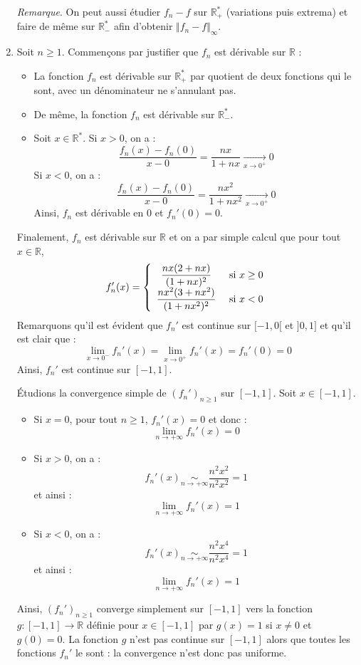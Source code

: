 \documentclass[a4paper,10pt]{report}
\begin{document}
\begin{enumerate}
\medskip

\noindent \textit{Remarque}. On peut aussi étudier $f_n-f$ sur $\mathbb{R}_+^{*}$ (variations puis extrema) et faire de même sur $\mathbb{R}_{-}^*$ afin d'obtenir $\Vert f_n-f \Vert_{\infty}$.

\medskip

\item Soit $n \geq 1$. Commençons par justifier que $f_n$ est dérivable sur $\mathbb{R}$ :
\begin{itemize}
\item La fonction $f_n$ est dérivable sur $\mathbb{R}_+^{*}$ par quotient de deux fonctions qui le sont, avec un dénominateur ne s'annulant pas.
\item De même, la fonction $f_n$ est dérivable sur $\mathbb{R}_{-}^{*}$.
\item Soit $x \in \mathbb{R}^*$. Si $x>0$, on a :
$$ \dfrac{f_n(x)-f_n(0)}{x-0} = \dfrac{nx}{1+nx} \underset{x \rightarrow 0^{+}}{\longrightarrow} 0$$
Si $x<0$, on a :
$$ \dfrac{f_n(x)-f_n(0)}{x-0} = \dfrac{nx^2}{1+nx^2} \underset{x \rightarrow 0^{+}}{\longrightarrow} 0$$
Ainsi, $f_n$ est dérivable en $0$ et $f_n'(0)=0$.
\end{itemize}

\medskip

\noindent Finalement, $f_n$ est dérivable sur $\mathbb{R}$ et on a par simple calcul que pour tout $x \in \mathbb{R}$,
$$ f_n'(x)  = \left\lbrace \begin{array}{cl}
\dfrac{nx(2+nx)}{(1+nx)^2} & \hbox{ si } x \geq 0 \\
\dfrac{nx^2(3+nx^2)}{(1+nx^2)^2} & \hbox{ si }x  < 0 \\
\end{array}\right.$$
Remarquons qu'il est évident que $f_n'$ est continue sur $[-1,0[$ et $]0,1]$ et qu'il est clair que :
$$ \lim_{x \rightarrow 0^{-}} f_n'(x) = \lim_{x \rightarrow 0^{+}} f_n'(x) = f_n'(0)=0$$
Ainsi, $f_n'$ est continue sur $[-1,1]$.

\medskip

\noindent Étudions la convergence simple de $(f_n')_{n \geq 1}$ sur $[-1,1]$. Soit $x \in [-1,1]$.
\begin{itemize}
\item Si $x=0$, pour tout $n \geq 1$, $f_n'(x)=0$ et donc :
$$ \lim_{n \rightarrow + \infty} f_n'(x)=0$$
\item Si $x>0$, on a :
$$ f_n'(x) \underset{n \rightarrow + \infty}{\sim} \dfrac{n^2x^2}{n^2x^2} = 1$$
et ainsi :
$$ \lim_{n \rightarrow + \infty} f_n'(x)=1$$
\item Si $x<0$, on a :
$$ f_n'(x) \underset{n \rightarrow + \infty}{\sim} \dfrac{n^2x^4}{n^2x^4} = 1$$
et ainsi :
$$ \lim_{n \rightarrow + \infty} f_n'(x)=1$$
\end{itemize}
Ainsi, $(f_n')_{n \geq 1}$ converge simplement sur $[-1,1]$ vers la fonction $g : [-1,1] \rightarrow \mathbb{R}$ définie pour \linebreak $x \in [-1,1]$ par $g(x)=1$ si $x \neq 0$ et $g(0)=0$. La fonction $g$ n'est pas continue sur $[-1,1]$ alors que toutes les fonctions $f_n'$ le sont : la convergence n'est donc pas uniforme.
\end{enumerate}
\end{document}
